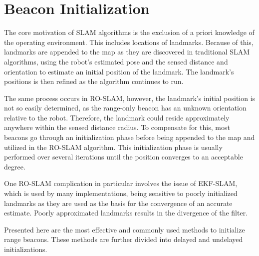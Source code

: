 \documentclass[conference]{IEEEtran}
\begin{document}
			
			
			
			
			
			

	\section{Beacon Initialization}
		\label{beacon initialization}
		The core motivation of SLAM algorithms is the exclusion of a priori knowledge of the operating environment. This includes locations of landmarks. Because of this, landmarks are appended to the map as they are discovered in traditional SLAM algorithms, using the robot's estimated pose and the sensed distance and orientation to estimate an initial position of the landmark. The landmark's positions is then refined as the algorithm continues to run.
		
		The same process occurs in RO-SLAM, however, the landmark's initial position is not so easily determined, as the range-only beacon has an unknown orientation relative to the robot. Therefore, the landmark could reside approximately anywhere within the sensed distance radius. To compensate for this, most beacons go through an initialization phase before being appended to the map and utilized in the RO-SLAM algorithm. This initialization phase is usually performed over several iterations until the position converges to an acceptable degree.
		
		One RO-SLAM complication in particular involves the issue of EKF-SLAM, which is used by many implementations, being  sensitive to poorly initialized landmarks as they are used as the basis for the convergence of an accurate estimate. Poorly approximated landmarks results in the divergence of the filter. 
		
		Presented here are the most effective and commonly used methods to initialize range beacons. These methods are further divided into delayed and undelayed initializations.
		
\end{document}
